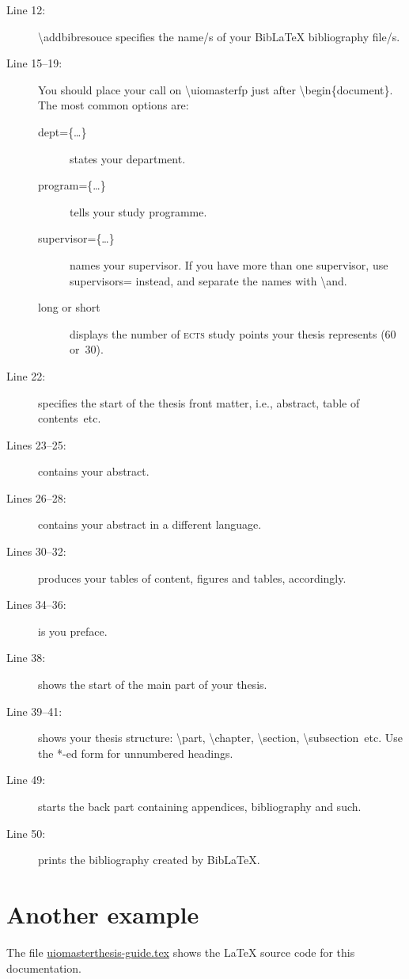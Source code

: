 \documentclass[UKenglish]{uiomasterthesis}
\newcommand{\bsl}{\textbackslash}
\newcommand{\p}[1]{\textsf{#1}}
\newcommand{\pcmd}[1]{\p{\bsl #1}}
\newcommand{\ppar}[1]{\p{\{#1\}}}
\begin{document}
\begin{description}
\item [Line 12:] \pcmd{addbibresouce} specifies the name/s of your Bib\LaTeX{}
  bibliography file/s.

\item[Line 15--19:] You should place your call on \pcmd{uiomasterfp}
  just after \pcmd{begin}\ppar{document}. The most common options are:
  \begin{description}
  \item[\p{dept=\ppar{\dots}}] states your department.
  \item[\p{program=\ppar{\dots}}] tells your study programme.
  \item[\p{supervisor=\ppar{\dots}}] names your supervisor. If you
    have more than one supervisor, use \p{supervisors=} instead, and
    separate the names with \pcmd{and}.
  \item[\p{long} \textmd{or} \p{short}] displays the number of
    \textsc{ects} study points your thesis represents (60 or~30).
  \end{description}

\item[Line 22:] specifies the start of the thesis front matter, i.e.,
  abstract, table of contents~etc.
\item[Lines 23--25:] contains your abstract.
\item[Lines 26--28:] contains your abstract in a different language.
\item[Lines 30--32:] produces your tables of content, figures and
  tables, accordingly.
\item[Lines 34--36:] is you preface.

\item[Line 38:] shows the start of the main part of your thesis.
\item[Line 39--41:] shows your thesis structure: \pcmd{part},
  \pcmd{chapter}, \pcmd{section}, \pcmd{subsection}~etc.
  Use the *-ed form for unnumbered headings.

\item[Line 49:] starts the back part containing appendices,
  bibliography and such.
\item[Line 50:] prints the bibliography created by Bib\LaTeX.
\end{description}

\section{Another example}
The file \url{uiomasterthesis-guide.tex} shows the \LaTeX{} source
code for this documentation.
\end{document}

